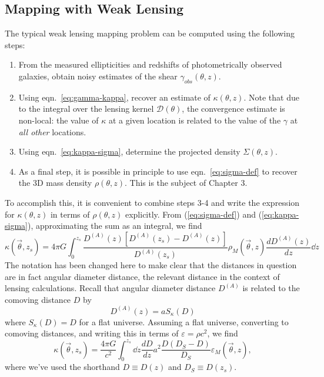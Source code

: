 \subsection{Mapping with Weak Lensing}
The typical weak lensing mapping problem can be computed using the following
steps:
\begin{enumerate}
  \item From the measured ellipticities and redshifts of photometrically
    observed galaxies, obtain noisy estimates of the shear
    $\gamma_{obs}(\theta, z)$.
  \item Using eqn.~\ref{eq:gamma-kappa}, recover an estimate of
    $\kappa(\theta, z)$.  Note that due to the integral over the lensing
    kernel $\mathcal{D}(\theta)$, the convergence estimate is non-local:
    the value of $\kappa$ at a given location is related to the value of the
    $\gamma$ at {\it all other} locations.
  \item Using eqn.~\ref{eq:kappa-sigma}, determine the projected density
    $\Sigma(\theta, z)$.
  \item As a final step, it is possible in principle to use
    eqn.~\ref{eq:sigma-def} to recover the 3D mass density
    $\rho(\theta, z)$.  This is the subject of Chapter 3.
\end{enumerate}
To accomplish this, it is convenient to combine steps 3-4 and write 
the expression for $\kappa(\theta,z)$ in terms of $\rho(\theta,z)$
explicitly.  From (\ref{eq:sigma-def}) and (\ref{eq:kappa-sigma}),
approximating the sum as an integral, we find
\begin{equation}
  \kappa(\vec{\theta},z_s) 
  = 4\pi G \int_0^{z_s} 
  \frac{D^{(A)}(z)[D^{(A)}(z_s)-D^{(A)}(z)]}{D^{(A)}(z_s)} 
  \rho_M(\vec{\theta},z) \frac{dD^{(A)}(z)}{dz} \dd z
\end{equation}
The notation has been changed here to make clear that the distances in 
question are in fact angular diameter distance, the relevant distance 
in the context of lensing calculations.  Recall that angular diameter 
distance $D^{(A)}$ is related to the comoving distance $D$ by
\begin{equation}
  D^{(A)}(z) = a S_\kappa (D)
\end{equation}
where $S_\kappa(D) = D$ for a flat universe.  Assuming a flat universe,
converting to comoving distances, 
and writing this in terms of $\varepsilon = \rho c^2$, we find
\begin{equation}
  \label{kappa-epsilon-1}
  \kappa(\vec{\theta},z_s) 
  = \frac{4\pi G}{c^2} \int_0^{z_s} \dd z\frac{dD}{dz} 
  a^2\frac{D(D_S-D)}{D_S} \varepsilon_M(\vec{\theta},z),
\end{equation}
where we've used the shorthand $D \equiv D(z)$ and 
$D_S \equiv D(z_s)$.

